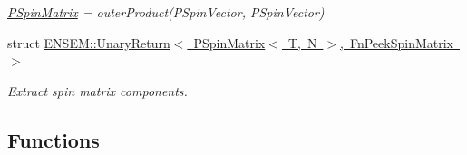 \begin{DoxyCompactItemize}
\begin{DoxyCompactList}\small\item\em \mbox{\hyperlink{classENSEM_1_1PSpinMatrix}{P\+Spin\+Matrix}} = outer\+Product(\+P\+Spin\+Vector, P\+Spin\+Vector) \end{DoxyCompactList}\item 
struct \mbox{\hyperlink{structENSEM_1_1UnaryReturn_3_01PSpinMatrix_3_01T_00_01N_01_4_00_01FnPeekSpinMatrix_01_4}{E\+N\+S\+E\+M\+::\+Unary\+Return$<$ P\+Spin\+Matrix$<$ T, N $>$, Fn\+Peek\+Spin\+Matrix $>$}}
\begin{DoxyCompactList}\small\item\em Extract spin matrix components. \end{DoxyCompactList}\end{DoxyCompactItemize}
\subsection*{Functions}
